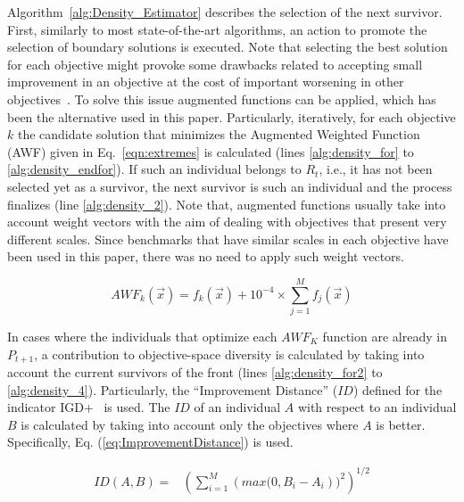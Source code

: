 Algorithm~\ref{alg:Density_Estimator} describes the selection of the next survivor.
%
First, similarly to most state-of-the-art algorithms, an action to promote the selection of boundary solutions
is executed.
%
Note that selecting the best solution for each objective might provoke some drawbacks related to accepting small improvement
in an objective at the cost of important worsening in other objectives~\cite{deb2016optimality}.
%
To solve this issue augmented functions can be applied, which has been the alternative used in this paper.
%
Particularly, iteratively, for each objective $k$ the candidate solution that minimizes the Augmented Weighted Function (AWF)
given in Eq.~\ref{eqn:extremes} is calculated (lines \ref{alg:density_for} to \ref{alg:density_endfor}).
%
If such an individual belongs to $R_t$, i.e., it has not been selected yet as a survivor, the next survivor is such an individual
and the process finalizes (line \ref{alg:density_2}).
%
Note that, augmented functions usually take into account weight vectors with the aim of dealing with objectives
that present very different scales.
%
Since benchmarks that have similar scales in each objective have been used in this paper, there was no need to apply
such weight vectors.

\begin{equation}\label{eqn:extremes}
AWF_k (\vec{x}) = f_k(\vec{x}) + 10^{-4} \times  \sum_{j=1}^M f_j( \vec{x} )
\end{equation}


In cases where the individuals that optimize each $AWF_K$ function are already in $P_{t+1}$, a contribution
to objective-space diversity is calculated by taking into account the current survivors of the front (lines \ref{alg:density_for2} to \ref{alg:density_4}).
%
%
Particularly, the ``Improvement Distance'' ($ID$) defined for the indicator IGD+~\cite{Joel:Inverted_Generational_Distance_Plus}
is used.
%
The $ID$ of an individual $A$ with respect to an individual $B$ is calculated by taking into account only the objectives
where $A$ is better.
%
Specifically, Eq. (\ref{eq:ImprovementDistance}) is used.

\begin{equation} \label{eq:ImprovementDistance}
\begin{split}
 ID(A, B) = &  \left (\sum_{i=1}^M \left (max(0, B_i - A_i \right ))^2  \right)^{1/2}
\end{split}
\end{equation}

